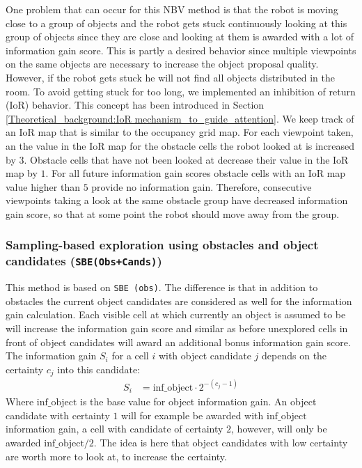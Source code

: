 \documentclass[a4paper,11pt,english]{article}
\begin{document}
One problem that can occur for this NBV method is that the robot is moving close to a group of objects and the robot gets stuck continuously looking at this group of objects since they are close and looking at them is awarded with a lot of information gain score.
This is partly a desired behavior since multiple viewpoints on the same objects are necessary to increase the object proposal quality. However, if the robot gets stuck he will not find all objects distributed in the room.
To avoid getting stuck for too long, we implemented an inhibition of return (IoR) behavior. This concept has been introduced in Section \ref{Theoretical_background:IoR mechanism_to_guide_attention}.
We keep track of an IoR map that is similar to the occupancy grid map.
For each viewpoint taken, an the value in the IoR map for the obstacle cells the robot looked at is increased by $3$.
Obstacle cells that have not been looked at decrease their value in the IoR map by $1$.
For all future information gain scores obstacle cells with an IoR map value higher than $5$ provide no information gain.
Therefore, consecutive viewpoints taking a look at the same obstacle group have decreased information gain score, so that at some point the robot should move away from the group.

\subsubsection{Sampling-based exploration using obstacles and object candidates (\texttt{SBE(Obs+Cands)})}
This method is based on \texttt{SBE (obs)}.
The difference is that in addition to obstacles the current object candidates are considered as well for the information gain calculation.
Each visible cell at which currently an object is assumed to be will increase the information gain score and similar as before unexplored cells in front of object candidates will award an additional bonus information gain score.
The information gain $S_i$ for a cell $i$ with object candidate $j$ depends on the certainty $c_j$ into this candidate:
\begin{align*}
 S_i &= \mbox{inf\_object}\cdot 2^{-(c_j-1)}
\end{align*}
Where $\mbox{inf\_object}$ is the base value for object information gain. An object candidate with certainty $1$ will for example be awarded with $\mbox{inf\_object}$ information gain, a cell with candidate of certainty $2$, however, will only be awarded $\mbox{inf\_object}/2$.
The idea is here that object candidates with low certainty are worth more to look at, to increase the certainty.
\end{document}
